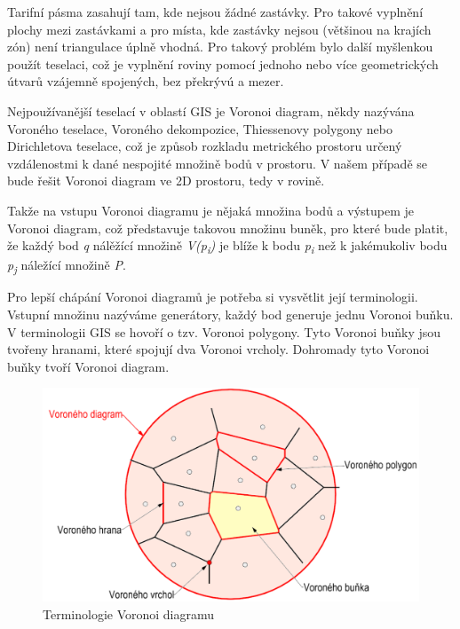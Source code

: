 Tarifní pásma zasahují tam, kde nejsou žádné zastávky. Pro takové vyplnění plochy
mezi zastávkami a pro místa, kde zastávky nejsou (většinou na krajích zón) není triangulace úplně
vhodná. Pro takový problém bylo další myšlenkou použít teselaci, což je vyplnění roviny pomocí jednoho
nebo více geometrických útvarů vzájemně spojených, bez překrývú a mezer.

Nejpoužívanější teselací v oblastí GIS je Voronoi diagram, někdy nazývána Voroného teselace, Voroného dekompozice,
Thiessenovy polygony nebo Dirichletova teselace, což je způsob rozkladu 
metrického prostoru určený vzdálenostmi k dané nespojité množině bodů v prostoru.
V našem případě se bude řešit Voronoi diagram ve 2D prostoru, tedy v rovině.

Takže na vstupu Voronoi diagramu je nějaká množina bodů a výstupem je Voronoi diagram, 
což představuje takovou množinu buněk, pro které bude platit, že každý bod
\textit{q} nálěžící množině \textit{V(p\textsubscript{i})} je blíže k bodu
\textit{p\textsubscript{i}} než k jakémukoliv
bodu \textit{p\textsubscript{j}} náležící množině \textit{P}.  \cite{bayer-voronoi}

Pro lepší chápání Voronoi diagramů je potřeba si vysvětlit její terminologii.
Vstupní množinu nazýváme generátory, každý bod generuje jednu Voronoi buňku. V 
terminologii GIS se hovoří o tzv. Voronoi polygony. Tyto Voronoi buňky jsou tvořeny hranami,
které spojují dva Voronoi vrcholy. Dohromady tyto Voronoi buňky tvoří Voronoi diagram.  

\begin{figure}[H] \centering
    \includegraphics[width=400pt]{./pictures/bayer-voronoi-terminologie.png}
    \caption[Terminologie Voronoi diagramu]{Terminologie Voronoi diagramu \cite{bayer-voronoi}}
	\label{fig:bayer-voronoi-terminologie}              
\end{figure}

